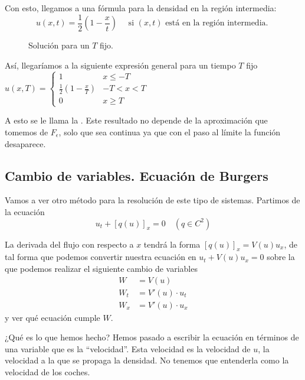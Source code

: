 \begin{example}
				Con esto, llegamos a una fórmula para la densidad en la región intermedia:
				\[ u(x,t) = \frac{1}{2} \left(1 - \frac{x}{t} \right) \quad \text{ si } (x,t) \text{ está en la región intermedia. } \]

				\begin{figure}[hbtp]
					\centering
					\caption{Solución para un $T$ fijo.}
					\label{fig:SolucionTFijo}
				\end{figure}

				Así, llegaríamos a la siguiente expresión general para un tiempo $T$ fijo
				\( u(x,T) =
				\begin{cases}
					1 & x \leq -T \\
					\frac{1}{2} \left(1 - \frac{x}{T}\right) & -T < x < T \\
					0 & x \geq T
				\end{cases} \label{eq:SolucionRarefaccion}
				\)

				A esto se le llama la . Este resultado no depende de la aproximación que tomemos de $F_\epsilon$, solo que sea continua ya que con el paso al límite la función desaparece.
			\end{example}


	\subsection{Cambio de variables. Ecuación de Burgers}
	\label{sec:EcuacionBurgers}

		Vamos a ver otro método para la resolución de este tipo de sistemas. Partimos de la ecuación
		\[ u_t + [q(u)]_x = 0 \quad (q \in C^2) \]

		La derivada del flujo con respecto a $x$ tendrá la forma $[q(u)]_x = V(u) u_x$, de tal forma que podemos convertir nuestra ecuación en \(
		u_t + V(u)u_x = 0 \label{eq:burgers1} \) sobre la que podemos realizar el siguiente cambio de variables
		\begin{align*}
		W &= V(u) \\
		W_t &= V'(u) \cdot u_t \\
		W_x &= V'(u) \cdot u_x
		\end{align*} y ver qué ecuación cumple $W$.

		¿Qué es lo que hemos hecho? Hemos pasado a escribir la ecuación en términos de una variable que es la ``velocidad''. Esta velocidad es la velocidad de $u$, la velocidad a la que se propaga la densidad. No tenemos que entenderla como la velocidad de los coches.


